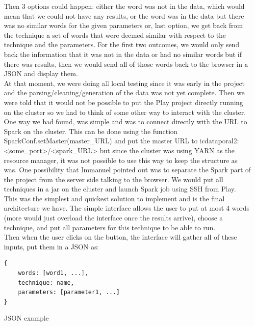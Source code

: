 \documentclass{article}
\begin{document}
Then 3 options could happen: either the word was not in the data, which would mean that we could not have any results, or the word was in the data but there was no similar words for the given parameters or, last option, we get back from the technique a set of words that were deemed similar with respect to the technique and the parameters.
For the first two outcomes, we would only send back the information that it was not in the data or had no similar words but if there was results, then we would send all of those words back to the browser in a JSON and display  them. \\

At that moment, we were doing all local testing since it was early in the project and the parsing/cleaning/generation of the data was not yet complete. Then we were told that it would not be possible to put the Play project directly running on the cluster so we had to think of some other way to interact with the cluster. \\

One way we had found, was simple and was to connect directly with the URL to Spark on the cluster. This can be done using the function SparkConf.setMaster(master_URL) and put the master URL to icdataporal2:<some_port>/<spark_URL> but since the cluster was using YARN as the resource manager, it was not possible to use this way to keep the structure as was. One possibility that Immanuel pointed out was to separate the Spark part of the project from the server side talking to the browser. We would put all techniques in a jar on the cluster and launch Spark job using SSH from Play. \\

This was the simplest and quickest solution to implement and is the final architecture we have. 
The simple interface allows the user to put at most 4 words (more would just overload the interface once the results arrive), choose a technique, and put all parameters for this technique to be able to run. \\

Then when the user clicks on the button, the interface will gather all of these inputs, put them in a JSON as: 
\begin{listing}
\begin{verbatim}
{
	words: [word1, ...],
	technique: name,
	parameters: [parameter1, ...]
}
\end{verbatim}
\caption{JSON example} 
\label{json-example}
\end{listing}
\end{document}
